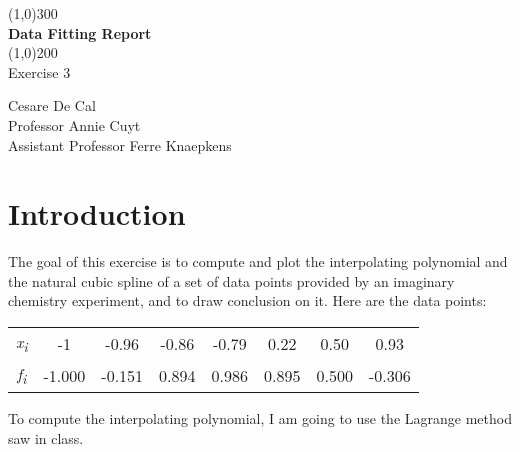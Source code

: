 \documentclass{article}
\begin{document}
\begin{titlepage}
	\begin{center}
	\line(1,0){300}\\
	[0.25in]
	\huge{\bfseries Data Fitting Report}  \\
	[2mm]
	\line(1,0){200} \\
	[1.5cm]
	\LARGE{Exercise 3} \\
	[12cm]
	\end{center}
	
	\begin{flushright}
	\large{Cesare De Cal \\
	[0.25cm]
	Professor Annie Cuyt \\
	[0.25cm]
	Assistant Professor Ferre Knaepkens \\
	}
	\end{flushright}
\end{titlepage}

\section{Introduction}\label{sec:intro}
The goal of this exercise is to compute and plot the interpolating polynomial and the natural cubic spline of a set of data points provided by an imaginary chemistry experiment, and to draw conclusion on it. Here are the data points:

  \begin{table}[!ht]
    \large        %
    \centering    %
    \begin{tabular}{|c|c|c|c|c|c|c|c|}
    \hline
    \it{x}\textsubscript{i}&-1&-0.96&-0.86&-0.79&0.22&0.50&0.93\\     %
    \it{f}\textsubscript{i}&-1.000&-0.151&0.894&0.986&0.895&0.500&-0.306\\
    \hline        %
    \end{tabular}
  \end{table}
To compute the interpolating polynomial, I am going to use the Lagrange method saw in class.


  
\end{document}
